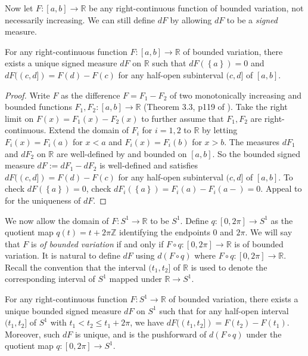 Now let \(F : [a, b] \to \mathbb{R}\) be any right-continuous function of bounded variation, not necessarily increasing. We can still define \(dF\) by allowing \(dF\) to be a \emph{signed} measure.

\begin{theorem}

For any right-continuous function \(F : [a, b] \to \mathbb{R}\) of bounded variation, there exists a unique signed measure \(dF\) on \(\mathbb{R}\) such that \(dF(\left\{ a \right\}) = 0\) and \(dF((c, d]) = F(d) - F(c)\) for any half-open subinterval \((c, d]\) of \([a, b]\).

\label{thm:lebesgue-stieltjes-signed}
\end{theorem}

\begin{proof}
Write \(F\) as the difference \(F = F_1 - F_2\) of two monotonically increasing and bounded functions \(F_1, F_2 : [a, b] \to \mathbb{R}\) (Theorem 3.3, p119 of \autocite{steinRealAnalysisMeasure2005}). Take the right limit on \(F(x) = F_1(x) - F_2(x)\) to further assume that \(F_1, F_2\) are right-continuous. Extend the domain of \(F_i\) for \(i=1, 2\) to \(\mathbb{R}\) by letting \(F_i(x) = F_i(a)\) for \(x < a\) and \(F_i(x) = F_i(b)\) for \(x > b\). The measures \(dF_1\) and \(dF_2\) on \(\mathbb{R}\) are well-defined by  and bounded on \([a, b]\). So the bounded signed measure \(dF := dF_1 - dF_2\) is well-defined and satisfies \(dF((c, d]) = F(d) - F(c)\) for any half-open subinterval \((c, d]\) of \([a, b]\). To check \(dF(\left\{ a \right\}) = 0\), check \(dF_i(\left\{ a \right\}) = F_i(a) - F_i(a-) = 0\). Appeal to  for the uniqueness of \(dF\).
\end{proof}

We now allow the domain of \(F : S^1 \to \mathbb{R}\) to be \(S^1\). Define \(q : [0, 2\pi] \to S^1\) as the quotient map \(q(t) = t + 2\pi \mathbb{Z}\) identifying the endpoints \(0\) and \(2\pi\). We will say that \(F\) is \emph{of bounded variation} if and only if \(F \circ q : [0, 2\pi] \to \mathbb{R}\) is of bounded variation. It is natural to define \(dF\) using \(d(F \circ q)\) where \(F \circ q : [0, 2\pi] \to \mathbb{R}\). Recall the convention that the interval \((t_1, t_2]\) of \(\mathbb{R}\) is used to denote the corresponding interval of \(S^1\) mapped under \(\mathbb{R} \to S^1\).

\begin{theorem}

For any right-continuous function \(F : S^1 \to \mathbb{R}\) of bounded variation, there exists a unique bounded signed measure \(dF\) on \(S^1\) such that for any half-open interval \((t_1, t_2]\) of \(S^1\) with \(t_1 < t_2 \leq t_1 + 2\pi\), we have \(dF((t_1, t_2]) = F(t_2) - F(t_1)\). Moreover, such \(dF\) is unique, and is the pushforward of \(d(F \circ q)\) under the quotient map \(q : [0, 2\pi] \to S^1\).

\label{thm:lebesgue-stieltjes-circle}
\end{theorem}

